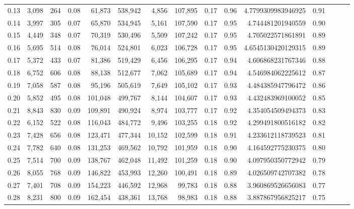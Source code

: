 \begin{tabular}{rrrrrrrrrrrrrrr}
0.13 &   3,098 &    264 &  0.08 &   61,873 &  538,942 &    4,856 &  107,895 &  0.17 &  0.96 &    4.7799309983946925 &      0.91 \\
0.14 &   3,997 &    305 &  0.07 &   65,870 &  534,945 &    5,161 &  107,590 &  0.17 &  0.95 &     4.744481201940559 &      0.90 \\
0.15 &   4,449 &    348 &  0.07 &   70,319 &  530,496 &    5,509 &  107,242 &  0.17 &  0.95 &     4.705022571861891 &      0.89 \\
0.16 &   5,695 &    514 &  0.08 &   76,014 &  524,801 &    6,023 &  106,728 &  0.17 &  0.95 &    4.6545130420129315 &      0.89 \\
0.17 &   5,372 &    433 &  0.07 &   81,386 &  519,429 &    6,456 &  106,295 &  0.17 &  0.94 &     4.606868231767346 &      0.88 \\
0.18 &   6,752 &    606 &  0.08 &   88,138 &  512,677 &    7,062 &  105,689 &  0.17 &  0.94 &     4.546984062225612 &      0.87 \\
0.19 &   7,058 &    587 &  0.08 &   95,196 &  505,619 &    7,649 &  105,102 &  0.17 &  0.93 &     4.484385947796472 &      0.86 \\
0.20 &   5,852 &    495 &  0.08 &  101,048 &  499,767 &    8,144 &  104,607 &  0.17 &  0.93 &     4.432483969100052 &      0.85 \\
0.21 &   8,843 &    830 &  0.09 &  109,891 &  490,924 &    8,974 &  103,777 &  0.17 &  0.92 &     4.354054509494373 &      0.83 \\
0.22 &   6,152 &    522 &  0.08 &  116,043 &  484,772 &    9,496 &  103,255 &  0.18 &  0.92 &     4.299491800516182 &      0.82 \\
0.23 &   7,428 &    656 &  0.08 &  123,471 &  477,344 &   10,152 &  102,599 &  0.18 &  0.91 &     4.233612118739523 &      0.81 \\
0.24 &   7,782 &    640 &  0.08 &  131,253 &  469,562 &   10,792 &  101,959 &  0.18 &  0.90 &     4.164592775230375 &      0.80 \\
0.25 &   7,514 &    700 &  0.09 &  138,767 &  462,048 &   11,492 &  101,259 &  0.18 &  0.90 &     4.097950350772942 &      0.79 \\
0.26 &   8,055 &    768 &  0.09 &  146,822 &  453,993 &   12,260 &  100,491 &  0.18 &  0.89 &     4.026509742707382 &      0.78 \\
0.27 &   7,401 &    708 &  0.09 &  154,223 &  446,592 &   12,968 &   99,783 &  0.18 &  0.88 &     3.960869526656083 &      0.77 \\
0.28 &   8,231 &    800 &  0.09 &  162,454 &  438,361 &   13,768 &   98,983 &  0.18 &  0.88 &     3.887867956825217 &      0.75 \\

\end{tabular}
